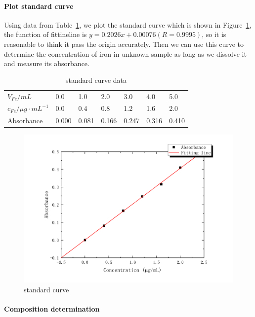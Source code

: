 \documentclass[journal=jacsat,manuscript=article]{achemso}
\begin{document}
\paragraph{Plot standard curve}
Using data from Table~\ref{tab.Cal}, we plot the standard curve which is shown in Figure~\ref{fig1}, the function of fittineline is $y=0.2026x+0.00076(R=0.9995)$, so it is reasonable to think it pass the origin accurately. Then we can use this curve to determine the concentration of iron in unknown sample as long as we dissolve it and measure its absorbance.
\begin{table}[H]
    \caption{standard curve data}
    \label{tab.Cal}
    \begin{tabular}{lllllll}
    \toprule
    $V_{Fe}/mL$    & 0.0 & 1.0 & 2.0 & 3.0 & 4.0 & 5.0 \\
    $c_{Fe}/\mu g\cdot mL^{-1}$
                   & 0.0 & 0.4 & 0.8 & 1.2 & 1.6 & 2.0 \\
    \midrule
    Absorbance     &0.000&0.081&0.166&0.247&0.316&0.410\\
    \bottomrule
    \end{tabular}
\end{table}

\begin{figure}[H]
    \includegraphics[width=\linewidth]{Fig1.pdf}
    \caption{standard curve}
    \label{fig1}
\end{figure}

\paragraph{Composition determination}
\end{document}
